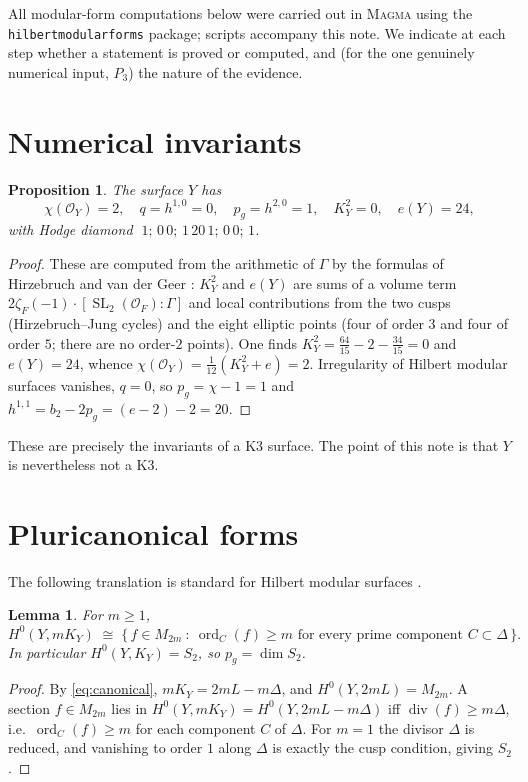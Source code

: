 \documentclass[11pt]{article}
\newtheorem{proposition}[theorem]{Proposition}
\newtheorem{lemma}[theorem]{Lemma}
\theoremstyle{definition}
\DeclareMathOperator{\ord}{ord}
\DeclareMathOperator{\SL}{SL}
\DeclareMathOperator{\Div}{div}
\newcommand{\cO}{\mathcal{O}}
\begin{document}
All modular-form computations below were carried out in \textsc{Magma} using
the \texttt{hilbertmodularforms} package; scripts accompany this note. We
indicate at each step whether a statement is proved or computed, and (for the
one genuinely numerical input, $P_3$) the nature of the evidence.

\section{Numerical invariants}

\begin{proposition}\label{prop:invariants}
The surface $Y$ has
\[
  \chi(\cO_Y)=2,\quad q=h^{1,0}=0,\quad p_g=h^{2,0}=1,\quad
  K_Y^2=0,\quad e(Y)=24,
\]
with Hodge diamond $\;1;\,0\,0;\,1\,20\,1;\,0\,0;\,1$.
\end{proposition}

\begin{proof}
These are computed from the arithmetic of $\Gamma$ by the formulas of
Hirzebruch and van der Geer \cite[Ch.~II--IV]{vdG}: $K_Y^2$ and $e(Y)$ are
sums of a volume term $2\zeta_F(-1)\cdot[\SL_2(\cO_F):\Gamma]$ and local
contributions from the two cusps (Hirzebruch--Jung cycles) and the eight
elliptic points (four of order $3$ and four of order $5$; there are no
order-$2$ points). One finds
$K_Y^2=\tfrac{64}{15}-2-\tfrac{34}{15}=0$ and $e(Y)=24$, whence
$\chi(\cO_Y)=\tfrac1{12}(K_Y^2+e)=2$. Irregularity of Hilbert modular
surfaces vanishes, $q=0$, so $p_g=\chi-1=1$ and
$h^{1,1}=b_2-2p_g=(e-2)-2=20$.
\end{proof}

These are precisely the invariants of a K3 surface. The point of this note is
that $Y$ is nevertheless not a K3.

\section{Pluricanonical forms}

The following translation is standard for Hilbert modular surfaces
\cite[Ch.~VII]{vdG}.

\begin{lemma}\label{lem:mcan}
For $m\ge1$,
\[
  H^0(Y,mK_Y)\;\cong\;\bigl\{\,f\in M_{2m}\ :\ \ord_C(f)\ge m
  \text{ for every prime component } C\subset\Delta\,\bigr\}.
\]
In particular $H^0(Y,K_Y)=S_2$, so $p_g=\dim S_2$.
\end{lemma}

\begin{proof}
By \eqref{eq:canonical}, $mK_Y=2mL-m\Delta$, and $H^0(Y,2mL)=M_{2m}$. A
section $f\in M_{2m}$ lies in $H^0(Y,mK_Y)=H^0(Y,2mL-m\Delta)$ iff
$\Div(f)\ge m\Delta$, i.e.\ $\ord_C(f)\ge m$ for each component $C$ of
$\Delta$. For $m=1$ the divisor $\Delta$ is reduced, and vanishing to order
$1$ along $\Delta$ is exactly the cusp condition, giving $S_2$.
\end{proof}
\end{document}
